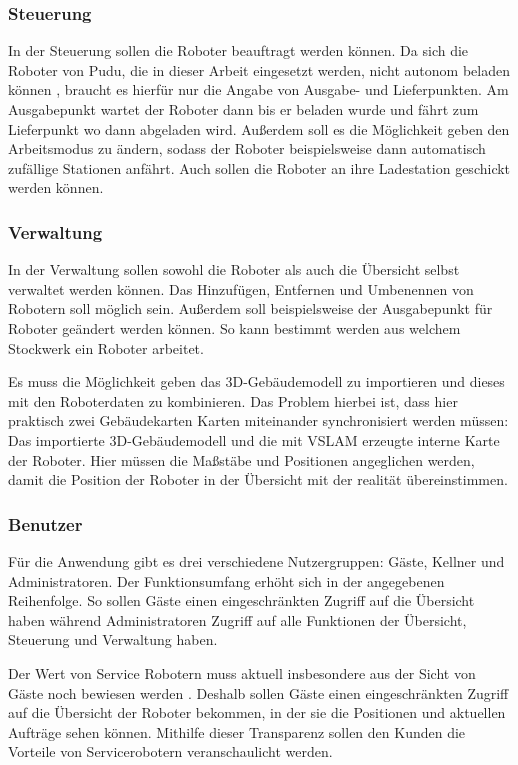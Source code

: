\subsubsection{Steuerung}

In der Steuerung sollen die Roboter beauftragt werden können. Da sich die Roboter von Pudu, die in dieser Arbeit eingesetzt werden, nicht autonom beladen können \cite{KettyBot2024}, braucht es hierfür nur die Angabe von Ausgabe- und Lieferpunkten. Am Ausgabepunkt wartet der Roboter dann bis er beladen wurde und fährt zum Lieferpunkt wo dann abgeladen wird. Außerdem soll es die Möglichkeit geben den Arbeitsmodus zu ändern, sodass der Roboter beispielsweise dann automatisch zufällige Stationen anfährt. Auch sollen die Roboter an ihre Ladestation geschickt werden können.

\subsubsection{Verwaltung}

In der Verwaltung sollen sowohl die Roboter als auch die Übersicht selbst verwaltet werden können. Das Hinzufügen, Entfernen und Umbenennen von Robotern soll möglich sein. Außerdem soll beispielsweise der Ausgabepunkt für Roboter geändert werden können. So kann bestimmt werden aus welchem Stockwerk ein Roboter arbeitet. 

Es muss die Möglichkeit geben das 3D-Gebäudemodell zu importieren und dieses mit den Roboterdaten zu kombinieren. Das Problem hierbei ist, dass hier praktisch zwei Gebäudekarten Karten miteinander synchronisiert werden müssen: Das importierte 3D-Gebäudemodell und die mit \ac{VSLAM} erzeugte interne Karte der Roboter. Hier müssen die Maßstäbe und Positionen angeglichen werden, damit die Position der Roboter in der Übersicht mit der realität übereinstimmen.

\subsubsection{Benutzer}

Für die Anwendung gibt es drei verschiedene Nutzergruppen: Gäste, Kellner und Administratoren. Der Funktionsumfang erhöht sich in der angegebenen Reihenfolge. So sollen Gäste einen eingeschränkten Zugriff auf die Übersicht haben während Administratoren Zugriff auf alle Funktionen der Übersicht, Steuerung und Verwaltung haben.

Der Wert von Service Robotern muss aktuell insbesondere aus der Sicht von Gäste noch bewiesen werden \cite[S.~429]{Paluch2020}. Deshalb sollen Gäste einen eingeschränkten Zugriff auf die Übersicht der Roboter bekommen, in der sie die Positionen und aktuellen Aufträge sehen können. Mithilfe dieser Transparenz sollen den Kunden die Vorteile von Servicerobotern veranschaulicht werden.

